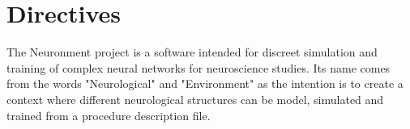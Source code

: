 \chapter{Directives}
\label{ch:directives}

The Neuronment project is a software intended for discreet simulation and training of complex neural networks for neuroscience studies. Its name comes from the words "Neurological" and "Environment" as the intention is to create a context where different neurological structures can be model, simulated and trained from a procedure description file.

\newpage